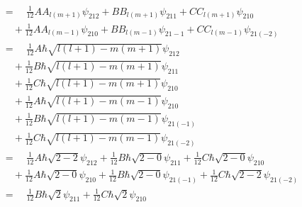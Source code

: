 \documentclass[fleqn, a4paper, 11pt, oneside]{amsart}
\theoremstyle{definition}
\theoremstyle{theorem}
\begin{document}
\begin{solution}
\begin{enumerate}[leftmargin=*]
\begin{align*}
                                               & = \quad \frac{1}{12} A A_{l (m + 1)} \psi_{2 1 2} + B B_{l (m + 1)} \psi_{2 1 1} + C C_{l (m + 1)} \psi_{2 1 0}                                                \\
                                               & \quad + \frac{1}{12} A A_{l (m - 1)} \psi_{2 1 0} + B B_{l (m - 1)} \psi_{2 1 -1} + C C_{l (m - 1)} \psi_{2 1 (-2)}                                            \\
                                               & = \quad \frac{1}{12} A \hbar \sqrt{l (l + 1) - m (m + 1)} \psi_{2 1 2}                                                                                         \\
                                               & \quad + \frac{1}{12} B \hbar \sqrt{l (l + 1) - m (m + 1)} \psi_{2 1 1}                                                                                         \\
                                               & \quad + \frac{1}{12} C \hbar \sqrt{l (l + 1) - m (m + 1)} \psi_{2 1 0}                                                                                         \\
                                               & \quad + \frac{1}{12} A \hbar \sqrt{l (l + 1) - m (m - 1)} \psi_{2 1 0}                                                                                         \\
                                               & \quad + \frac{1}{12} B \hbar \sqrt{l (l + 1) - m (m - 1)} \psi_{2 1 (-1)}                                                                                      \\
                                               & \quad + \frac{1}{12} C \hbar \sqrt{l (l + 1) - m (m - 1)} \psi_{2 1 (-2)}                                                                                      \\
                                               & = \quad \frac{1}{12} A \hbar \sqrt{2 - 2} \psi_{2 1 2} + \frac{1}{12} B \hbar \sqrt{2 - 0} \psi_{2 1 1} + \frac{1}{12} C \hbar \sqrt{2 - 0} \psi_{2 1 0}       \\
                                               & \quad + \frac{1}{12} A \hbar \sqrt{2 - 0} \psi_{2 1 0} + \frac{1}{12} B \hbar \sqrt{2 - 0} \psi_{2 1 (-1)} + \frac{1}{12} C \hbar \sqrt{2 - 2} \psi_{2 1 (-2)} \\
                                               & = \quad \frac{1}{12} B \hbar \sqrt{2} \psi_{2 1 1} + \frac{1}{12} C \hbar \sqrt{2} \psi_{2 1 0}                                                                \\

\end{align*}
\end{enumerate}
\end{solution}
\end{document}
